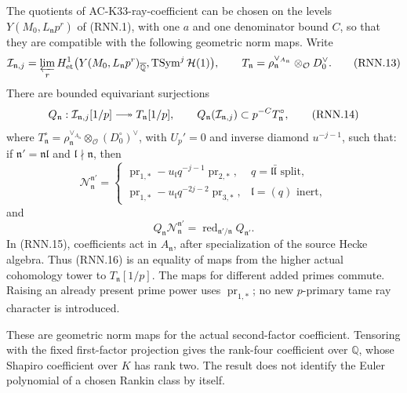 \begin{theorem}
\label{AC-K33-ray-norm}
The quotients of AC-K33-ray-coefficient can be chosen on the
levels \(Y(M_0,L_{\mathfrak n}p^r)\) of (RNN.1), with one
\(a\) and one denominator bound \(C\), so that they are compatible
with the following geometric norm maps.
Write
\[
 \mathcal I_{\mathfrak n,j}
 =\varprojlim_r H^1_{\rm et}
   \bigl(Y(M_0,L_{\mathfrak n}p^r)_{\overline{\mathbb Q}},
               \operatorname{TSym}^j\mathcal H(1)\bigr),
 \qquad
 T_{\mathfrak n}
  =\rho_{\mathfrak n}^{\vee_{A_{\mathfrak n}}}
                         \otimes_{\mathcal O}D_0^\vee.
 \tag{RNN.13}
\]
There are bounded equivariant surjections
\[
 Q_{\mathfrak n}:\mathcal I_{\mathfrak n,j}[1/p]
              \longtwoheadrightarrow T_{\mathfrak n}[1/p],
 \qquad
 Q_{\mathfrak n}(\mathcal I_{\mathfrak n,j})
       \subset p^{-C}T_{\mathfrak n}^{\circ},
 \tag{RNN.14}
\]
where
\(T_{\mathfrak n}^{\circ}
=\rho_{\mathfrak n}^{\vee_{A_{\mathfrak n}}}
 \otimes_{\mathcal O}(D_0^\circ)^\vee\),
with \(U_p'=0\) and inverse diamond \(u^{-j-1}\), such that:
if \(\mathfrak n'=\mathfrak n\mathfrak l\) and
\(\mathfrak l\nmid\mathfrak n\), then
\[
 \mathcal N_{\mathfrak n}^{\mathfrak n'}
 =\begin{cases}
   \operatorname{pr}_{1,*}
      -u_{\mathfrak l}q^{-j-1}\operatorname{pr}_{2,*},
     &q=\mathfrak l\bar{\mathfrak l}\text{ split},\\[2mm]
   \operatorname{pr}_{1,*}
      -u_{\mathfrak l}q^{-2j-2}\operatorname{pr}_{3,*},
     &\mathfrak l=(q)\text{ inert},
  \end{cases}
 \tag{RNN.15}
\]
and
\[
 Q_{\mathfrak n}\mathcal N_{\mathfrak n}^{\mathfrak n'}
    =\operatorname{red}_{\mathfrak n'/\mathfrak n}
           Q_{\mathfrak n'}.
 \tag{RNN.16}
\]
In (RNN.15), coefficients act in \(A_{\mathfrak n}\), after
specialization of the source Hecke algebra.  Thus (RNN.16) is
an equality of maps from the higher actual cohomology tower
to \(T_{\mathfrak n}[1/p]\).
The maps for different added primes commute.  Raising an
already present prime power uses \(\operatorname{pr}_{1,*}\);
no new \(p\)-primary tame ray character is introduced.

These are geometric norm maps for the actual second-factor
coefficient.  Tensoring with the fixed first-factor projection
gives the rank-four coefficient over \(\mathbb Q\), whose Shapiro
coefficient over \(K\) has rank two.
The result does not identify the Euler polynomial of a chosen
Rankin class by itself.
\end{theorem}
